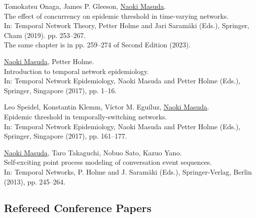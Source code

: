 \documentclass[11pt,letter]{article}
\begin{document}
\begin{etaremune}

\item Tomokatsu Onaga, James P. Gleeson, \underline{Naoki Masuda}.\\
The effect of concurrency on epidemic threshold in time-varying networks.\\
In: Temporal Network Theory, Petter Holme and Jari Saram\"{a}ki (Eds.), Springer, Cham (2019). pp. 253--267.\\
The same chapter is in pp. 259--274 of Second Edition (2023).

\item \underline{Naoki Masuda}, Petter Holme.\\
Introduction to temporal network epidemiology.\\
In: Temporal Network Epidemiology, Naoki Masuda and Petter Holme (Eds.), Springer, Singapore (2017), pp. 1--16.

\item Leo Speidel, Konstantin Klemm, V\'{i}ctor M. Egu\'{i}luz, \underline{Naoki Masuda}.\\
Epidemic threshold in temporally-switching networks.\\
In: Temporal Network Epidemiology, Naoki Masuda and Petter Holme (Eds.), Springer, Singapore (2017), pp. 161--177.

\item \underline{Naoki Masuda}, Taro Takaguchi, Nobuo Sato, Kazuo Yano.\\
Self-exciting point process modeling of conversation event sequences.\\
In: Temporal Networks, P. Holme and J. Saram\"{a}ki (Eds.), Springer-Verlag, Berlin (2013), pp. 245--264.

\end{etaremune}

\subsection*{\bf \normalsize Refereed Conference Papers}
\end{document}
